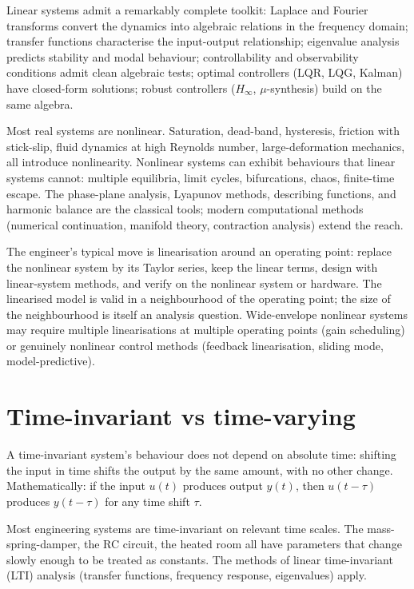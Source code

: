Linear systems admit a remarkably complete toolkit: Laplace and Fourier transforms convert the dynamics into algebraic relations in the frequency domain; transfer functions characterise the input-output relationship; eigenvalue analysis predicts stability and modal behaviour; controllability and observability conditions admit clean algebraic tests; optimal controllers (LQR, LQG, Kalman) have closed-form solutions; robust controllers ($H_\infty$, $\mu$-synthesis) build on the same algebra.

Most real systems are nonlinear. Saturation, dead-band, hysteresis, friction with stick-slip, fluid dynamics at high Reynolds number, large-deformation mechanics, all introduce nonlinearity. Nonlinear systems can exhibit behaviours that linear systems cannot: multiple equilibria, limit cycles, bifurcations, chaos, finite-time escape. The phase-plane analysis, Lyapunov methods, describing functions, and harmonic balance are the classical tools; modern computational methods (numerical continuation, manifold theory, contraction analysis) extend the reach.

The engineer's typical move is linearisation around an operating point: replace the nonlinear system by its Taylor series, keep the linear terms, design with linear-system methods, and verify on the nonlinear system or hardware. The linearised model is valid in a neighbourhood of the operating point; the size of the neighbourhood is itself an analysis question. Wide-envelope nonlinear systems may require multiple linearisations at multiple operating points (gain scheduling) or genuinely nonlinear control methods (feedback linearisation, sliding mode, model-predictive).

\section{Time-invariant vs time-varying}

A time-invariant system's behaviour does not depend on absolute time: shifting the input in time shifts the output by the same amount, with no other change. Mathematically: if the input $u(t)$ produces output $y(t)$, then $u(t - \tau)$ produces $y(t - \tau)$ for any time shift $\tau$.

Most engineering systems are time-invariant on relevant time scales. The mass-spring-damper, the RC circuit, the heated room all have parameters that change slowly enough to be treated as constants. The methods of linear time-invariant (LTI) analysis (transfer functions, frequency response, eigenvalues) apply.

